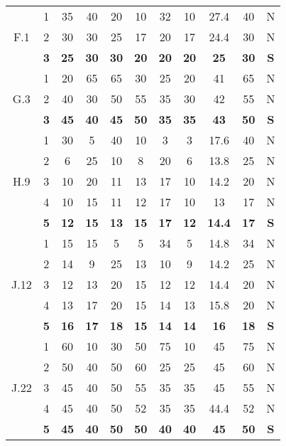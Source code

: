 \documentclass[11pt,a4paper,spanish,twoside]{book}
\begin{document}
\begin{table}[!h]
\begin{tabular}{|c|c||c|c|c|c|c||c|c|c||c|}
    \hline \multirow{3}{*}{F.1} 
    & 1 & 35 & 40 & 20 & 10 & 32 & 10 & 27.4 & 40 & N \\
    & 2 & 30 & 30 & 25 & 17 & 20 & 17 & 24.4 & 30 & N \\
    & \textbf{3} & \textbf{25} & \textbf{30} & \textbf{30} & \textbf{20} &
    \textbf{20} & \textbf{20} & \textbf{25} & \textbf{30} & \textbf{S} \\ 

    \hline \multirow{3}{*}{G.3} 
    & 1 & 20 & 65 & 65 & 30 & 25 & 20 & 41 & 65 & N \\
    & 2 & 40 & 30 & 50 & 55 & 35 & 30 & 42 & 55 & N \\
    & \textbf{3} & \textbf{45} & \textbf{40} & \textbf{45} & \textbf{50} &
    \textbf{35} & \textbf{35} & \textbf{43} & \textbf{50} & \textbf{S} \\ 

    \hline \multirow{5}{*}{H.9} 
    & 1 & 30 & 5  & 40 & 10 & 3  & 3  & 17.6 & 40 & N \\
    & 2 & 6  & 25 & 10 & 8  & 20 & 6  & 13.8 & 25 & N \\
    & 3 & 10 & 20 & 11 & 13 & 17 & 10 & 14.2 & 20 & N \\
    & 4 & 10 & 15 & 11 & 12 & 17 & 10 & 13   & 17 & N \\
    & \textbf{5} & \textbf{12} & \textbf{15} & \textbf{13} & \textbf{15} &
    \textbf{17} & \textbf{12} & \textbf{14.4} & \textbf{17} & \textbf{S} \\ 
    
    \hline \multirow{5}{*}{J.12} 
    & 1 & 15 & 15 & 5  & 5  & 34 & 5  & 14.8 & 34 & N \\
    & 2 & 14 & 9  & 25 & 13 & 10 & 9  & 14.2 & 25 & N \\
    & 3 & 12 & 13 & 20 & 15 & 12 & 12 & 14.4 & 20 & N \\
    & 4 & 13 & 17 & 20 & 15 & 14 & 13 & 15.8 & 20 & N \\
    & \textbf{5} & \textbf{16} & \textbf{17} & \textbf{18} & \textbf{15} &
    \textbf{14} & \textbf{14} & \textbf{16} & \textbf{18} & \textbf{S} \\ 
    
    \hline \multirow{5}{*}{J.22} 
    & 1 & 60 & 10 & 30 & 50 & 75 & 10 & 45   & 75 & N \\
    & 2 & 50 & 40 & 50 & 60 & 25 & 25 & 45   & 60 & N \\
    & 3 & 45 & 40 & 50 & 55 & 35 & 35 & 45   & 55 & N \\
    & 4 & 45 & 40 & 50 & 52 & 35 & 35 & 44.4 & 52 & N \\
    & \textbf{5} & \textbf{45} & \textbf{40} & \textbf{50} & \textbf{50} &
    \textbf{40} & \textbf{40} & \textbf{45} & \textbf{50} & \textbf{S} \\ 
    

\end{tabular}
\end{table}
\end{document}
